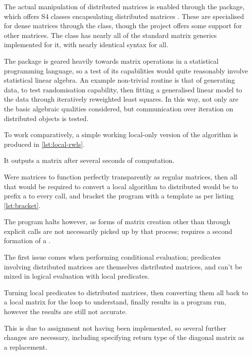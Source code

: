 The actual manipulation of distributed matrices is enabled through the  package, which offers S4 classes encapsulating distributed matrices \cite{pbdDMATpackage}.
These are specialised for dense matrices through the  class, though the project offers some support for other matrices.
The  class has nearly all of the standard matrix generics implemented for it, with nearly identical syntax for all.

The package is geared heavily towards matrix operations in a statistical programming language, so a test of its capabilities would quite reasonably involve statistical linear algebra.
An example non-trivial routine is that of generating data, to test randomisation capability, then fitting a generalised linear model to the data through iteratively reweighted least squares.
In this way, not only are the basic algebraic qualities considered, but communication over iteration on distributed objects is tested.

To work comparatively, a simple working local-only version of the algorithm is produced in \cref{lst:local-rwls}.


It outputs a  matrix after several seconds of computation.

Were  matrices to function perfectly transparently as regular matrices, then all that would be required to convert a local algorithm to distributed would be to prefix a  to every  call, and bracket the program with a template as per listing \cref{lst:bracket}.


The program halts however, as forms of matrix creation other than through explicit  calls are not necessarily picked up by that process;  requires a second formation of a .

The first issue comes when performing conditional evaluation; predicates involving distributed matrices are themselves distributed matrices, and can't be mixed in logical evaluation with local predicates.

Turning local predicates to distributed matrices, then converting them all back to a local matrix for the loop to understand, finally results in a program run, however the results are still not accurate.

This is due to  assignment not having been implemented, so several further changes are necessary, including specifying return type of the diagonal matrix as a replacement.

